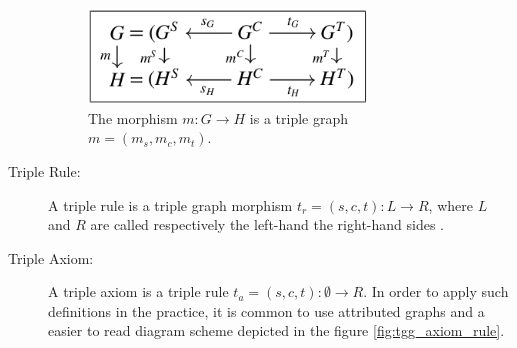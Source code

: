 \documentclass[tuberlin,cic,tc,english,noabntcite]{iiufrgs}
\begin{document}
\begin{description}
	\begin{figure}[h]
	    \caption{The morphism $m: G \rightarrow H$ is a triple graph $m = (m_s,m_c,m_t)$.}
	    \begin{center}
	        \includegraphics[width=20em]{tg_morphism}   
	    \end{center}
	    \label{fig:tg_morphism}
	\end{figure}

	\item[Triple Rule:] A triple rule is a triple graph morphism $t_r = (s, c, t) : L \rightarrow R$, where $L$ and $R$ are called respectively the left-hand the right-hand sides \citep{ehrig2007information}.
	
	\item[Triple Axiom:] A triple axiom is a triple rule $t_a = (s, c, t) : \emptyset \rightarrow R$. In order to apply such definitions in the practice, it is common to use attributed graphs and a easier to read diagram scheme depicted in the figure \ref{fig:tgg_axiom_rule}.



\end{description}
\end{document}
